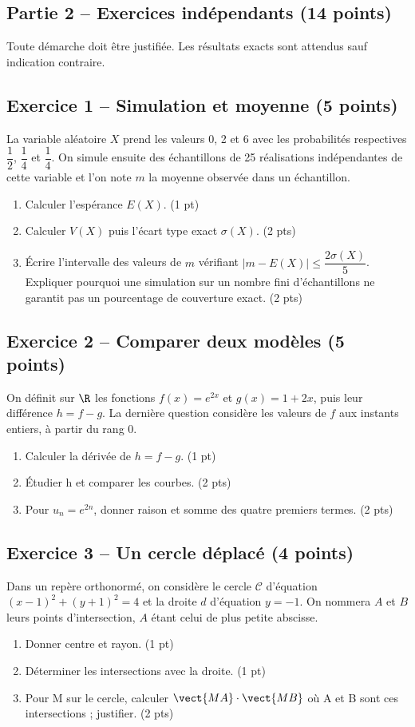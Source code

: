 \clearpage\subsection*{Partie 2 -- Exercices indépendants (14 points)}
Toute démarche doit être justifiée. Les résultats exacts sont attendus sauf indication contraire.
\subsection*{Exercice 1 -- Simulation et moyenne (5 points)}
La variable aléatoire $X$ prend les valeurs 0, 2 et 6 avec les probabilités respectives $\dfrac12$, $\dfrac14$ et $\dfrac14$. On simule ensuite des échantillons de 25 réalisations indépendantes de cette variable et l’on note $m$ la moyenne observée dans un échantillon.
\begin{enumerate}
\item Calculer l’espérance $E(X)$. \hfill(1 pt)
\item Calculer $V(X)$ puis l’écart type exact $\sigma(X)$. \hfill(2 pts)
\item Écrire l’intervalle des valeurs de $m$ vérifiant $|m-E(X)|\leq\dfrac{2\sigma(X)}5$. Expliquer pourquoi une simulation sur un nombre fini d’échantillons ne garantit pas un pourcentage de couverture exact. \hfill(2 pts)
\end{enumerate}
\subsection*{Exercice 2 -- Comparer deux modèles (5 points)}
On définit sur $\R$ les fonctions $f(x)=e^{2x}$ et $g(x)=1+2x$, puis leur différence $h=f-g$. La dernière question considère les valeurs de $f$ aux instants entiers, à partir du rang 0.
\begin{enumerate}
\item Calculer la dérivée de $h=f-g$. \hfill(1 pt)
\item Étudier h et comparer les courbes. \hfill(2 pts)
\item Pour $u_n=e^{2n}$, donner raison et somme des quatre premiers termes. \hfill(2 pts)
\end{enumerate}
\subsection*{Exercice 3 -- Un cercle déplacé (4 points)}
Dans un repère orthonormé, on considère le cercle $\mathcal C$ d’équation $(x-1)^2+(y+1)^2=4$ et la droite $d$ d’équation $y=-1$. On nommera $A$ et $B$ leurs points d’intersection, $A$ étant celui de plus petite abscisse.
\begin{enumerate}
\item Donner centre et rayon. \hfill(1 pt)
\item Déterminer les intersections avec la droite. \hfill(1 pt)
\item Pour M sur le cercle, calculer $\vect{MA}\cdot\vect{MB}$ où A et B sont ces intersections ; justifier. \hfill(2 pts)
\end{enumerate}
